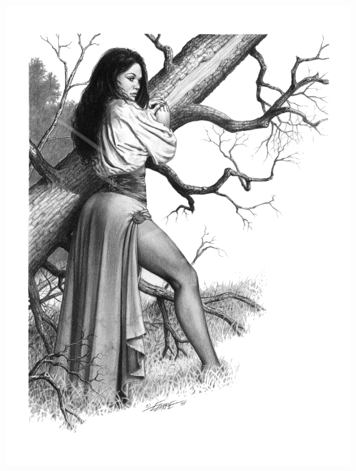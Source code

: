 \begin{multicols*}{2}
\begin{Figure}
\centering
\includegraphics[width=\textwidth]{img/bard.png}
\end{Figure}
    
\end{multicols*}

        
